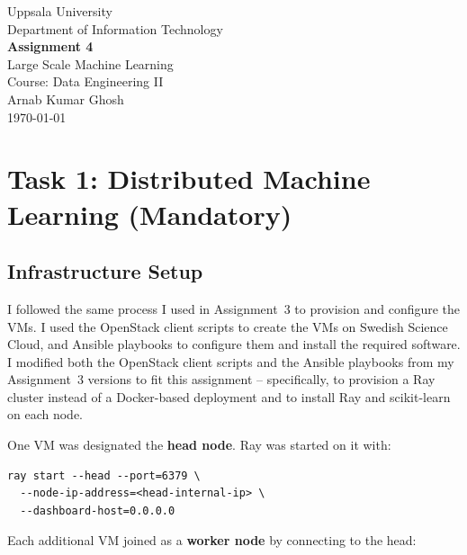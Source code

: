 \documentclass[11pt,a4paper]{article}
\begin{document}
\begin{titlepage}
  \centering
  \vspace*{2cm}
  {\large Uppsala University\\[0.3em]
   Department of Information Technology\\[2cm]}
  {\LARGE\bfseries Assignment 4\\[0.5em]}
  {\Large Large Scale Machine Learning\\[2cm]}
  {\large Course: Data Engineering II\\[1.5cm]}
  {\normalsize Arnab Kumar Ghosh\\[0.5cm]}
  {\normalsize \today\\[3cm]}
  \vfill
\end{titlepage}

\tableofcontents
\newpage

\section{Task 1: Distributed Machine Learning (Mandatory)}

\subsection{Infrastructure Setup}

I followed the same process I used in Assignment~3 to provision and configure the VMs.
I used the OpenStack client scripts to create the VMs on Swedish Science Cloud, and Ansible playbooks
to configure them and install the required software.
I modified both the OpenStack client scripts and the Ansible playbooks from my
Assignment~3 versions to fit this assignment -- specifically, to provision a Ray cluster
instead of a Docker-based deployment and to install Ray and scikit-learn on each node.

One VM was designated the \textbf{head node}. Ray was started on it with:

\begin{lstlisting}[style=shell]
ray start --head --port=6379 \
  --node-ip-address=<head-internal-ip> \
  --dashboard-host=0.0.0.0
\end{lstlisting}

Each additional VM joined as a \textbf{worker node} by connecting to the head:
\end{document}
